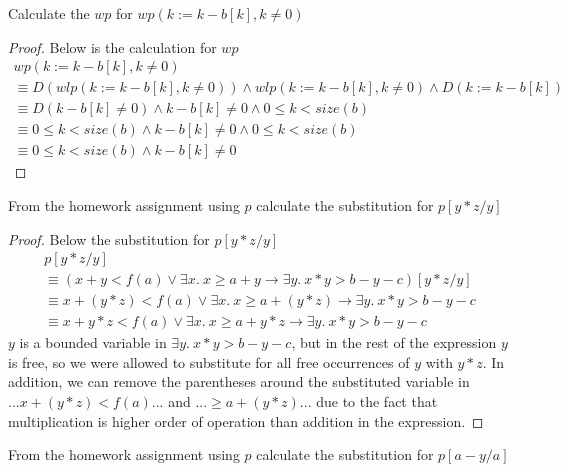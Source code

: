 \documentclass[12pt]{article}
\newenvironment{exercise}[2][Exercise]{\begin{trivlist}
\item[\hskip \labelsep {\bfseries #1}\hskip \labelsep {\bfseries #2.}]}{\end{trivlist}}
\begin{document}
\begin{exercise}{7}
Calculate the $wp$ for $wp(k:= k-b[k], k \neq 0)$
\end{exercise}

\begin{proof}
Below is the calculation for $wp$
\begin{gather*}
    wp(k:= k-b[k], k \neq 0) \\ 
    \equiv D(wlp(k:= k-b[k], k \neq 0)) \land wlp(k:= k-b[k], k \neq 0) \land D(k:= k-b[k]) \\ 
    \equiv D(k-b[k] \neq 0) \land k-b[k] \neq 0 \land 0 \leq k < size(b) \\ 
    \equiv 0 \leq k < size(b) \land k -b[k] \neq 0 \land 0 \leq k < size(b) \\ 
    \equiv 0 \leq k < size(b) \land k -b[k] \neq 0
\end{gather*}

\end{proof}

\begin{exercise}{8}
From the homework assignment using $p$ calculate the substitution for $p[y*z/y]$
\end{exercise}

\begin{proof}
Below the substitution for $p[y*z/y]$
\begin{gather*}
    p[y*z/y] \\ 
    \equiv (x+y < f(a) \lor \exists x .\: x \geq a + y \rightarrow \exists y .\: x*y > b-y-c)[y*z/y] \\ 
    \equiv x+(y*z) < f(a) \lor \exists x .\: x \geq a+(y*z) \rightarrow \exists y .\: x*y > b - y - c \\ 
    \equiv x+y*z < f(a) \lor \exists x .\: x \geq a +y*z \rightarrow \exists y .\: x*y > b-y-c
\end{gather*}
$y$ is a bounded variable in $\exists y .\: x*y > b-y-c$, but in the rest of the expression $y$ is free, so we were allowed to substitute for all free occurrences of $y$ with $y*z$. In addition, we can remove the parentheses around the substituted variable in  $...x+(y*z) < f(a)...$ and $... \geq a+(y*z)...$ due to the fact that multiplication is higher order of operation than addition in the expression. 

\end{proof}

\begin{exercise}{9}
From the homework assignment using $p$ calculate the substitution for $p[a-y/a]$
\end{exercise}
\end{document}
